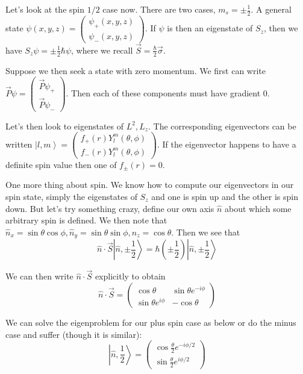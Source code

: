 \documentclass[10pt]{report}
\newcommand{\ket}[1]{\left|#1\right>}
\begin{document}
Let's look at the spin $1/2$ case now. There are two cases, $m_s = \pm \frac{1}{2}$. A general state $\psi(x,y,z) = \begin{pmatrix}\psi_+(x,y,z)\\ \psi_-(x,y,z)\end{pmatrix}$. If $\psi$ is then an eigenstate of $S_z$, then we have $S_z\psi =  \pm \frac{1}{2}\hbar \psi$, where we recall $\vec{S} = \frac{\hbar}{2}\vec{\sigma}$.

Suppose we then seek a state with zero momentum. We first can write $\vec{P}\psi = \begin{pmatrix}\vec{P} \psi_+\\ \vec{P}\psi_-\end{pmatrix}$. Then each of these components must have gradient $0$.

Let's then look to eigenstates of $L^2, L_z$. The corresponding eigenvectors can be written $\ket{l,m} = \begin{pmatrix} f_+(r) Y_l^m(\theta,\phi)\\f_-(r)Y_l^m(\theta,\phi)\end{pmatrix}$. If the eigenvector happens to have a definite spin value then one of $f_{\pm}(r) = 0$.

One more thing about spin. We know how to compute our eigenvectors in our spin state, simply the eigenstates of $S_z$ and one is spin up and the other is spin down. But let's try something crazy, define our own axis $\hat{n}$ about which some arbitrary spin is defined. We then note that $\hat{n}_x = \sin\theta\cos\phi, \hat{n}_y = \sin\theta\sin\phi, \hat{n}_z = \cos \theta$. Then we see that
$$\hat{n}\cdot \vec{S}\ket{\hat{n},\pm\frac{1}{2}} = \hbar\left( \pm\frac{1}{2} \right)\ket{\hat{n},\pm\frac{1}{2}}$$

We can then write $\hat{n}\cdot \vec{S}$ explicitly to obtain
$$\hat{n}\cdot \vec{S} = \begin{pmatrix}\cos \theta & \sin \theta e^{-i\phi}\\\sin\theta e^{i\phi} & -\cos \theta\end{pmatrix}$$

We can solve the eigenproblem for our plus spin case as below or do the minus case and suffer (though it is similar):
$$\ket{\hat{n},\frac{1}{2}} = \begin{pmatrix}\cos \frac{\theta}{2}e^{-i\phi/2} \\ \sin \frac{\theta}{2}e^{i\phi/2}\end{pmatrix}$$
\end{document}
